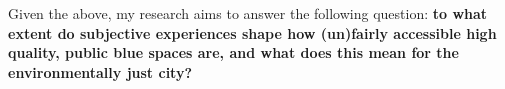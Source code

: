 \documentclass{article}
\newcommand{\bisection}[1]{\textbf{\textit{#1}}}
\begin{document}
Given the above, my research aims to answer the following question: \textbf{to what extent do subjective experiences shape how (un)fairly accessible high quality, public blue spaces are, and what does this mean for the environmentally just city?}


\begin{comment}
\section{Research design}



To answer my research question, I will use the following sub-questions:

\begin{enumerate}
	\item Who are the users of the space, how do they perceive it and how do they feel in it?
	\item Why do they choose to use this space?
	\item How diverse are the users... 
	\item How 
\end{enumerate}

\subsection{Methodology}

Data on perceived accessibility is a subjective measure, based on qualitative data. It cannot be quantified in the same way as physical proximity


\end{comment}
\end{document}
